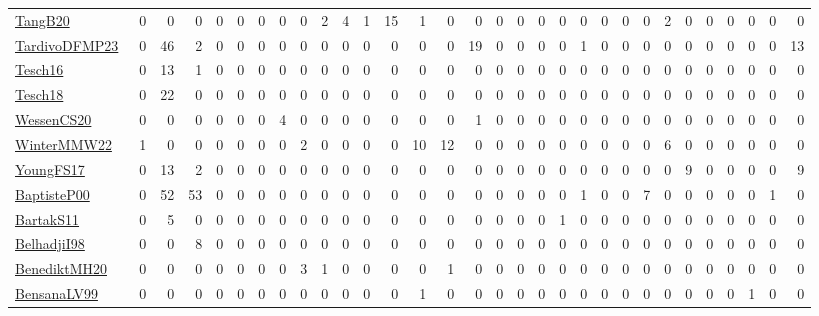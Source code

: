 \documentclass[a4paper]{article}
\begin{document}
{\begin{longtable}{l*{30}{r}}
\href{papers/TangB20.pdf}{TangB20}~\cite{TangB20} & 0 & 0 & 0 & 0 & 0 & 0 & 0 & 0 & 2 & 4 & 1 & 15 & 1 & 0 & 0 & 0 & 0 & 0 & 0 & 0 & 0 & 0 & 0 & 2 & 0 & 0 & 0 & 0 & 0 & 0\\
\href{papers/TardivoDFMP23.pdf}{TardivoDFMP23}~\cite{TardivoDFMP23} & 0 & 46 & 2 & 0 & 0 & 0 & 0 & 0 & 0 & 0 & 0 & 0 & 0 & 0 & 19 & 0 & 0 & 0 & 0 & 1 & 0 & 0 & 0 & 0 & 0 & 0 & 0 & 0 & 0 & 13\\
\href{papers/Tesch16.pdf}{Tesch16}~\cite{Tesch16} & 0 & 13 & 1 & 0 & 0 & 0 & 0 & 0 & 0 & 0 & 0 & 0 & 0 & 0 & 0 & 0 & 0 & 0 & 0 & 0 & 0 & 0 & 0 & 0 & 0 & 0 & 0 & 0 & 0 & 0\\
\href{papers/Tesch18.pdf}{Tesch18}~\cite{Tesch18} & 0 & 22 & 0 & 0 & 0 & 0 & 0 & 0 & 0 & 0 & 0 & 0 & 0 & 0 & 0 & 0 & 0 & 0 & 0 & 0 & 0 & 0 & 0 & 0 & 0 & 0 & 0 & 0 & 0 & 0\\
\href{papers/WessenCS20.pdf}{WessenCS20}~\cite{WessenCS20} & 0 & 0 & 0 & 0 & 0 & 0 & 4 & 0 & 0 & 0 & 0 & 0 & 0 & 0 & 1 & 0 & 0 & 0 & 0 & 0 & 0 & 0 & 0 & 0 & 0 & 0 & 0 & 0 & 0 & 0\\
\href{papers/WinterMMW22.pdf}{WinterMMW22}~\cite{WinterMMW22} & 1 & 0 & 0 & 0 & 0 & 0 & 0 & 2 & 0 & 0 & 0 & 0 & 10 & 12 & 0 & 0 & 0 & 0 & 0 & 0 & 0 & 0 & 0 & 6 & 0 & 0 & 0 & 0 & 0 & 0\\
\href{papers/YoungFS17.pdf}{YoungFS17}~\cite{YoungFS17} & 0 & 13 & 2 & 0 & 0 & 0 & 0 & 0 & 0 & 0 & 0 & 0 & 0 & 0 & 0 & 0 & 0 & 0 & 0 & 0 & 0 & 0 & 0 & 0 & 9 & 0 & 0 & 0 & 0 & 9\\
\href{articles/BaptisteP00.pdf}{BaptisteP00}~\cite{BaptisteP00} & 0 & 52 & 53 & 0 & 0 & 0 & 0 & 0 & 0 & 0 & 0 & 0 & 0 & 0 & 0 & 0 & 0 & 0 & 0 & 1 & 0 & 0 & 7 & 0 & 0 & 0 & 0 & 0 & 1 & 0\\
\href{articles/BartakS11.pdf}{BartakS11}~\cite{BartakS11} & 0 & 5 & 0 & 0 & 0 & 0 & 0 & 0 & 0 & 0 & 0 & 0 & 0 & 0 & 0 & 0 & 0 & 0 & 1 & 0 & 0 & 0 & 0 & 0 & 0 & 0 & 0 & 0 & 0 & 0\\
\href{articles/BelhadjiI98.pdf}{BelhadjiI98}~\cite{BelhadjiI98} & 0 & 0 & 8 & 0 & 0 & 0 & 0 & 0 & 0 & 0 & 0 & 0 & 0 & 0 & 0 & 0 & 0 & 0 & 0 & 0 & 0 & 0 & 0 & 0 & 0 & 0 & 0 & 0 & 0 & 0\\
\href{articles/BenediktMH20.pdf}{BenediktMH20}~\cite{BenediktMH20} & 0 & 0 & 0 & 0 & 0 & 0 & 0 & 3 & 1 & 0 & 0 & 0 & 0 & 1 & 0 & 0 & 0 & 0 & 0 & 0 & 0 & 0 & 0 & 0 & 0 & 0 & 0 & 0 & 0 & 0\\
\href{articles/BensanaLV99.pdf}{BensanaLV99}~\cite{BensanaLV99} & 0 & 0 & 0 & 0 & 0 & 0 & 0 & 0 & 0 & 0 & 0 & 0 & 1 & 0 & 0 & 0 & 0 & 0 & 0 & 0 & 0 & 0 & 0 & 0 & 0 & 0 & 0 & 1 & 0 & 0\\

\end{longtable}}
\end{document}
